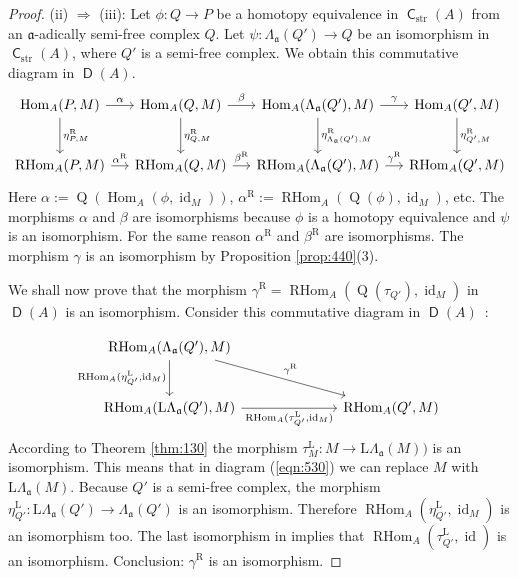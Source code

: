 \documentclass[10pt]{amsart}
\theoremstyle{definition}
\numberwithin{equation}{section}
\newcommand{\opn}{\operatorname}
\newcommand{\cat}[1]{\operatorname{\mathsf{#1}}}
\newcommand{\mfrak}[1]{\mathfrak{#1}}
\newcommand{\mrm}[1]{\mathrm{#1}}
\newcommand{\al}{\alpha}
\newcommand{\ga}{\gamma}
\newcommand{\La}{\Lambda}
\renewcommand{\a}{\mfrak{a}}
\begin{document}
\begin{proof}
\medskip \noindent
(ii) $\Rightarrow$ (iii):
Let $\phi : Q \to P$ be a homotopy equivalence in $\cat{C}_{\mrm{str}}(A)$ from
an $\a$-adically semi-free complex $Q$. Let
$\psi : \La_{\a}(Q') \to Q$ be an isomorphism in $\cat{C}_{\mrm{str}}(A)$,
where $Q'$ is a semi-free complex.
We obtain this commutative diagram in $\cat{D}(A)$.
\begin{equation} \label{eqn:531}
\begin{tikzcd} [column sep = 3ex, row sep = 6ex]
\opn{Hom}_A(P, M)
\ar[d, "{\eta^{\mrm{R}}_{P, M}}"]
\ar[r, "{\al}"]
&
\opn{Hom}_A(Q, M)
\ar[d, "{\eta^{\mrm{R}}_{Q, M}}"]
\ar[r, "{\beta}"]
&
\opn{Hom}_A(\La_{\a}(Q'), M)
\ar[d, "{\eta^{\mrm{R}}_{\La_{\a}(Q'), M}}"]
\ar[r, "{\ga}"]
&
\opn{Hom}_A(Q', M)
\ar[d, "{\eta^{\mrm{R}}_{Q', M}}"]
\\
\opn{RHom}_A(P, M)
\ar[r, "{\al^{\mrm{R}}}"]
&
\opn{RHom}_A(Q, M)
\ar[r, "{\beta^{\mrm{R}}}"]
&
\opn{RHom}_A(\La_{\a}(Q'), M)
\ar[r, "{\ga^{\mrm{R}}}"]
&
\opn{RHom}_A(Q', M)
\end{tikzcd}
\end{equation}
Here
$\al := \opn{Q}(\opn{Hom}_A(\phi, \opn{id}_M))$,
$\al^{\mrm{R}} := \opn{RHom}_A(\opn{Q}(\phi), \opn{id}_M)$, etc.
The morphisms $\al$ and $\beta$ are isomorphisms because
$\phi$ is a homotopy equivalence and $\psi$ is an isomorphism.
For the same reason $\al^{\mrm{R}}$ and $\beta^{\mrm{R}}$ are isomorphisms.
The morphism $\ga$ is an isomorphism by Proposition \ref{prop:440}(3).

We shall now prove that the morphism
$\ga^{\mrm{R}} =  \opn{RHom}_{A}(\opn{Q}(\tau_{Q'}), \opn{id}_M)$
in $\cat{D}(A)$ is an isomorphism.
Consider this commutative diagram in $\cat{D}(A)$~:

\begin{equation} \label{eqn:530}
\begin{tikzcd} [column sep = 16ex, row sep = 6ex]
\opn{RHom}_A(\La_{\a}(Q'), M)
\ar[dr, "{\ga^{\mrm{R}}}"]
\ar[d, "{\opn{RHom}_A(\eta^{\mrm{L}}_{Q'}, \opn{id}_M)}"']
\\
\opn{RHom}_A(\mrm{L} \La_{\a}(Q'), M)
\ar[r, "{\opn{RHom}_A(\tau^{\mrm{L}}_{Q'}, \opn{id}_M)}"']
&
\opn{RHom}_A(Q', M)
\end{tikzcd}
\end{equation}
According to Theorem \ref{thm:130} the morphism
$\tau^{\mrm{L}}_{M} : M \to \mrm{L} \La_{\a}(M))$
is an isomorphism. This means that in diagram (\ref{eqn:530}) we can replace
$M$ with $\mrm{L} \La_{\a}(M)$.
Because $Q'$ is a semi-free complex, the morphism
$\eta^{\mrm{L}}_{Q'} : \mrm{L} \La_{\a}(Q') \to \La_{\a}(Q')$
is an isomorphism.
Therefore
$\opn{RHom}_A(\eta^{\mrm{L}}_{Q'}, \opn{id}_M)$
is an isomorphism too.
The last isomorphism in \cite[Erratum, Theorem 9]{PSY1} implies that
$\opn{RHom}_A(\tau^{\mrm{L}}_{Q'}, \opn{id})$
is an isomorphism. Conclusion: $\ga^{\mrm{R}}$ is an isomorphism.


\end{proof}
\end{document}
